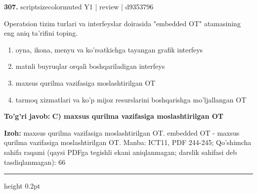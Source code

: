 \documentclass[10pt,a4paper]{article}
\begin{document}
{\bfseries\sffamily\color{ink} 307.} {scriptsizecolor{muted} Y1 | review | d9353796}
\par
Operatsion tizim turlari va interfeyslar doirasida "embedded OT" atamasining eng aniq ta'rifini toping.
\begin{enumerate}[label=\Alph*),leftmargin=9mm]
\item oyna, ikona, menyu va ko'rsatkichga tayangan grafik interfeys
\item matnli buyruqlar orqali boshqariladigan interfeys
\item maxsus qurilma vazifasiga moslashtirilgan OT
\item tarmoq xizmatlari va ko'p mijoz resurslarini boshqarishga mo'ljallangan OT
\end{enumerate}
\begin{tcolorbox}[enhanced,breakable,colback=teal!4,colframe=teal!60!black,boxrule=0.45pt,arc=1.2mm,left=2.7mm,right=2.7mm,top=1.8mm,bottom=1.8mm,before skip=2mm,after skip=2mm]
{\bfseries\sffamily\color{teal}To'g'ri javob:} \textbf{C) maxsus qurilma vazifasiga moslashtirilgan OT}
\par\smallskip
{\bfseries Izoh:} maxsus qurilma vazifasiga moslashtirilgan OT. embedded OT - maxsus qurilma vazifasiga moslashtirilgan OT. Manba: ICT11, PDF 244-245; Qo'shimcha sahifa raqami (qaysi PDFga tegishli ekani aniqlanmagan; darslik sahifasi deb tasdiqlanmagan): 66
\end{tcolorbox}
\vspace{2mm}\hrule height 0.2pt\vspace{3mm}
\end{document}

